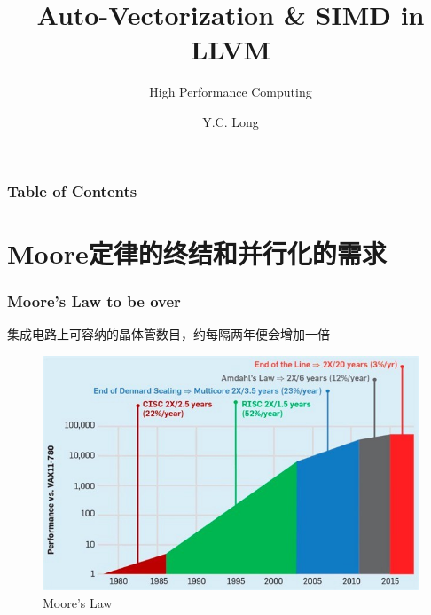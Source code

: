 \documentclass[aspectratio=169]{ctexbeamer}
\title{Auto-Vectorization \& SIMD in LLVM}
\subtitle{High Performance Computing}
\author{Y.C. Long}
\begin{document}
\begin{frame}
    \maketitle
\end{frame}

\begin{frame}
    \frametitle{Table of Contents}

    \tableofcontents

\end{frame}

\section{Moore定律的终结和并行化的需求}

\begin{frame}
    \frametitle{Moore's Law to be over}

    集成电路上可容纳的晶体管数目，约每隔两年便会增加一倍

    \begin{figure}[h]
        \includegraphics[height=0.5\textheight]{images/moore.jpeg}
        \caption{Moore's Law}
    \end{figure}

\end{frame}
\end{document}
